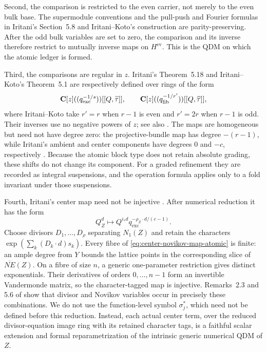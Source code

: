 Second, the comparison is restricted to the even carrier, not merely to the
even bulk base.  The supermodule conventions and the pull-push and Fourier
formulas in Iritani's Section~5.8 and Iritani--Koto's construction are
parity-preserving.  After the odd bulk variables are set to zero, the
comparison and its inverse therefore restrict to mutually inverse maps on
\(H^{\mathrm{ev}}\).  This is the QDM on which the atomic ledger is formed.

Third, the comparisons are regular in \(z\).  Iritani's Theorem~5.18 and
Iritani--Koto's Theorem~5.1 are respectively defined over rings of the form
\[
 \mathbf C[z]((q_{\mathrm{exc}}^{-1/s}))[[Q,\widetilde\tau]],
 \qquad
 \mathbf C[z]((q_{\mathrm{fib}}^{-1/r'}))[[Q,\widehat\tau]],
\]
where Iritani--Koto take \(r'=r\) when \(r-1\) is even and \(r'=2r\) when
\(r-1\) is odd.  Their inverses use no negative powers of \(z\); see also
\cite[Remark~5.3]{IritaniKoto}.  The maps are homogeneous but need not have
degree zero: the projective-bundle map has degree \(-(r-1)\), while Iritani's
ambient and center components have degrees \(0\) and \(-c\), respectively
\cite[Theorem~5.1(3)]{IritaniKoto}\cite[Theorem~5.18(3)]{IritaniBlowup}.
Because the atomic block type does not retain absolute grading, these shifts
do not change its component.  For a graded refinement they are recorded as
integral suspensions, and the operation formula applies only to a fold
invariant under those suspensions.

Fourth, Iritani's center map need not be injective
\cite[(5.15)]{IritaniBlowup}.  After numerical reduction it has the form
\begin{equation}
 Q_Z^d\longmapsto
 Q^{i_*d}q_{\mathrm{exc}}^{-\rho_Z\cdot d/(c-1)}.
 \label{eq:center-novikov-map-atomic}
\end{equation}
Choose divisors \(D_1,\ldots,D_\rho\) separating \(N_1(Z)\) and retain the
characters \(\exp(\sum_k(D_k\cdot d)s_k)\).  Every fibre of
\eqref{eq:center-novikov-map-atomic} is finite: an ample degree from \(Y\)
bounds the lattice points in the corresponding slice of
\(\overline{NE}(Z)\).  On a fibre of size \(n\), a generic one-parameter
restriction gives distinct exponentials.  Their derivatives of orders
\(0,\ldots,n-1\) form an invertible Vandermonde matrix, so the
character-tagged map is injective.
Remarks~2.3 and 5.6 of \cite{IritaniBlowup} show that divisor and Novikov
variables occur in precisely these combinations.  We do not use the
function-level symbol \(\sigma_j^*\), which need not be defined before this
reduction.  Instead, each actual center term, over the reduced
divisor-equation image ring with its retained character tags, is a faithful
scalar extension and formal reparametrization of the intrinsic generic
numerical QDM of \(Z\).

